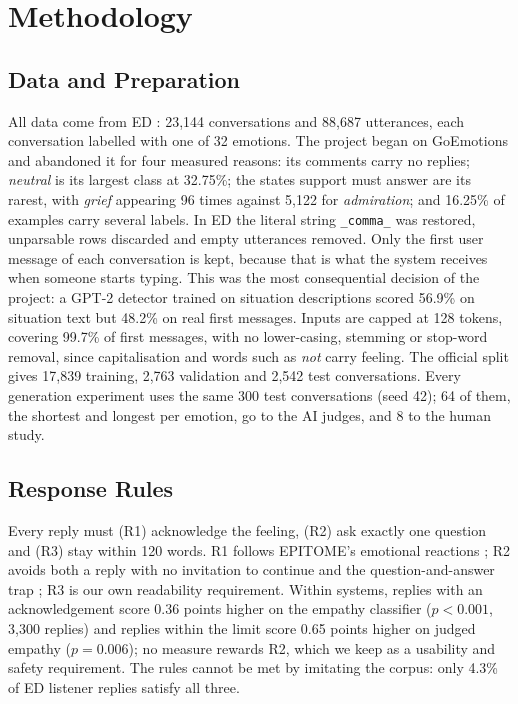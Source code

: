 \section{Methodology}\label{sec:method}

\subsection{Data and Preparation}
All data come from ED \cite{rashkin2019}: 23,144 conversations and 88,687 utterances, each conversation labelled with one of 32 emotions. The project began on GoEmotions \cite{demszky2020} and abandoned it for four measured reasons: its comments carry no replies; \textit{neutral} is its largest class at 32.75\%; the states support must answer are its rarest, with \textit{grief} appearing 96 times against 5,122 for \textit{admiration}; and 16.25\% of examples carry several labels. In ED the literal string \texttt{\_comma\_} was restored, unparsable rows discarded and empty utterances removed. Only the first user message of each conversation is kept, because that is what the system receives when someone starts typing. This was the most consequential decision of the project: a GPT-2 detector trained on situation descriptions scored 56.9\% on situation text but 48.2\% on real first messages. Inputs are capped at 128 tokens, covering 99.7\% of first messages, with no lower-casing, stemming or stop-word removal, since capitalisation and words such as \textit{not} carry feeling. The official split gives 17,839 training, 2,763 validation and 2,542 test conversations. Every generation experiment uses the same 300 test conversations (seed 42); 64 of them, the shortest and longest per emotion, go to the AI judges, and 8 to the human study.

\subsection{Response Rules}
Every reply must (R1) acknowledge the feeling, (R2) ask exactly one question and (R3) stay within 120 words. R1 follows EPITOME's emotional reactions \cite{sharma2020epitome}; R2 avoids both a reply with no invitation to continue and the question-and-answer trap \cite{samhsa2019tip35}; R3 is our own readability requirement. Within systems, replies with an acknowledgement score 0.36 points higher on the empathy classifier ($p<0.001$, 3,300 replies) and replies within the limit score 0.65 points higher on judged empathy ($p=0.006$); no measure rewards R2, which we keep as a usability and safety requirement. The rules cannot be met by imitating the corpus: only 4.3\% of ED listener replies satisfy all three.

